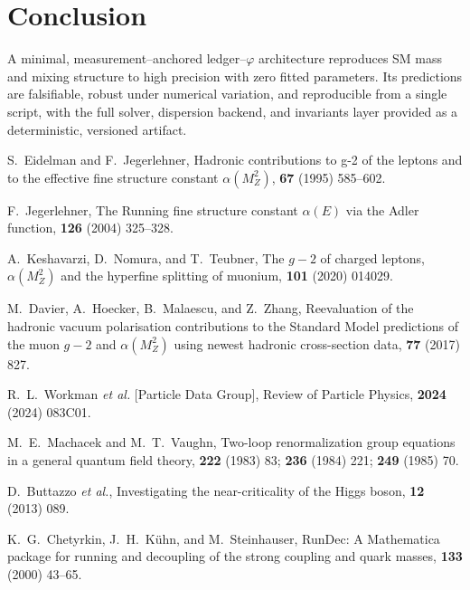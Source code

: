 \documentclass[11pt]{article}
\begin{document}
\section{Conclusion}
A minimal, measurement–anchored ledger–$\varphi$ architecture reproduces SM mass and mixing structure to high precision with zero fitted parameters. Its predictions are falsifiable, robust under numerical variation, and reproducible from a single script, with the full solver, dispersion backend, and invariants layer provided as a deterministic, versioned artifact.

\begin{thebibliography}{99}

S.~Eidelman and F.~Jegerlehner,
\newblock Hadronic contributions to g-2 of the leptons and to the effective fine structure constant $\alpha(M_Z^2)$,
 {\bf 67} (1995) 585--602.

F.~Jegerlehner,
\newblock The Running fine structure constant $\alpha(E)$ via the Adler function,
 {\bf 126} (2004) 325--328.

A.~Keshavarzi, D.~Nomura, and T.~Teubner,
\newblock The $g{-}2$ of charged leptons, $\alpha(M_Z^2)$ and the hyperfine splitting of muonium,
 {\bf 101} (2020) 014029.

M.~Davier, A.~Hoecker, B.~Malaescu, and Z.~Zhang,
\newblock Reevaluation of the hadronic vacuum polarisation contributions to the Standard Model predictions of the muon $g{-}2$ and $\alpha(M_Z^2)$ using newest hadronic cross-section data,
 {\bf 77} (2017) 827.

R.~L.~Workman {\em et al.} [Particle Data Group],
\newblock Review of Particle Physics,
 {\bf 2024} (2024) 083C01.

M.~E.~Machacek and M.~T.~Vaughn,
\newblock Two-loop renormalization group equations in a general quantum field theory,
 {\bf 222} (1983) 83; {\bf 236} (1984) 221; {\bf 249} (1985) 70.

D.~Buttazzo {\em et al.},
\newblock Investigating the near-criticality of the Higgs boson,
 {\bf 12} (2013) 089.

K.~G.~Chetyrkin, J.~H.~K{\"u}hn, and M.~Steinhauser,
\newblock RunDec: A Mathematica package for running and decoupling of the strong coupling and quark masses,
 {\bf 133} (2000) 43--65.


\end{thebibliography}
\end{document}
